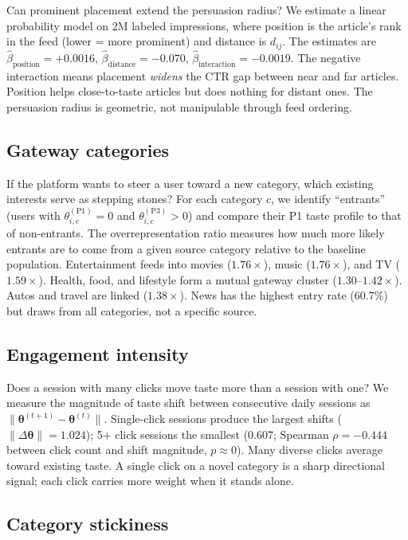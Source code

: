 \documentclass[11pt]{article}
\begin{document}
Can prominent placement extend the persuasion radius? We estimate a linear probability model on 2M labeled impressions, where position is the article's rank in the feed (lower = more prominent) and distance is $d_{ij}$. The estimates are $\hat\beta_{\text{position}} = +0.0016$, $\hat\beta_{\text{distance}} = -0.070$, $\hat\beta_{\text{interaction}} = -0.0019$. The negative interaction means placement \emph{widens} the CTR gap between near and far articles. Position helps close-to-taste articles but does nothing for distant ones. The persuasion radius is geometric, not manipulable through feed ordering.

\subsection{Gateway categories}

If the platform wants to steer a user toward a new category, which existing interests serve as stepping stones? For each category $c$, we identify ``entrants'' (users with $\theta_{i,c}^{(\text{P1})} = 0$ and $\theta_{i,c}^{(\text{P3})} > 0$) and compare their P1 taste profile to that of non-entrants. The overrepresentation ratio measures how much more likely entrants are to come from a given source category relative to the baseline population. Entertainment feeds into movies ($1.76\times$), music ($1.76\times$), and TV ($1.59\times$). Health, food, and lifestyle form a mutual gateway cluster ($1.30$--$1.42\times$). Autos and travel are linked ($1.38\times$). News has the highest entry rate (60.7\%) but draws from all categories, not a specific source.

\subsection{Engagement intensity}

Does a session with many clicks move taste more than a session with one? We measure the magnitude of taste shift between consecutive daily sessions as $\|\boldsymbol{\theta}^{(t+1)} - \boldsymbol{\theta}^{(t)}\|$. Single-click sessions produce the largest shifts ($\|\Delta\boldsymbol{\theta}\| = 1.024$); 5+ click sessions the smallest ($0.607$; Spearman $\rho = -0.444$ between click count and shift magnitude, $p \approx 0$). Many diverse clicks average toward existing taste. A single click on a novel category is a sharp directional signal; each click carries more weight when it stands alone.

\subsection{Category stickiness}
\end{document}
